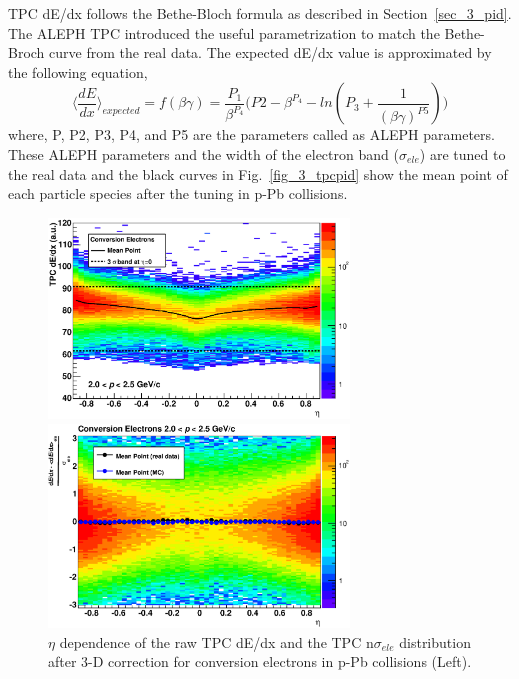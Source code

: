 TPC dE/dx follows the Bethe-Bloch formula as described in Section~\ref{sec_3_pid}. 
The ALEPH TPC introduced the useful parametrization to match the Bethe-Broch curve from the real data. 
The expected dE/dx value is approximated by the following equation, 
\begin{equation}
  \langle \frac{dE}{dx} \rangle_{expected} = f(\beta \gamma) = \frac{P_{1}}{\beta^{P_{4}}}\big( P2-\beta^{P_{4}}-ln(P_{3}+\frac{1}{(\beta\gamma)^{P5}}) \bigr)
\end{equation}
where, P, P2, P3, P4, and P5 are the parameters called as ALEPH parameters. These ALEPH parameters and the width of the electron band ($\sigma_{ele}$) are tuned to the real data and the black curves in Fig.~\ref{fig_3_tpcpid} show the mean point of each particle species after the tuning in p-Pb collisions. 


\begin{figure}[htbp]
 \begin{minipage}{0.5\hsize}
  \begin{center}
  \includegraphics[width=8cm]{chap4/figure/PID/RawTPCdEdxforConv_MB.eps}
  \end{center}
 \end{minipage}
 \begin{minipage}{0.5\hsize}
  \begin{center}
  \includegraphics[width=8cm]{chap4/figure/PID/TPCNSigmaforConv_MB.eps}
  \end{center}
 \end{minipage}
  \caption{$\eta$ dependence of the raw TPC dE/dx and the TPC n$\sigma_{ele}$ distribution after 3-D correction for conversion electrons in p-Pb collisions (Left).}
  \label{fig_4_tpcdedxforconv}
\end{figure}

